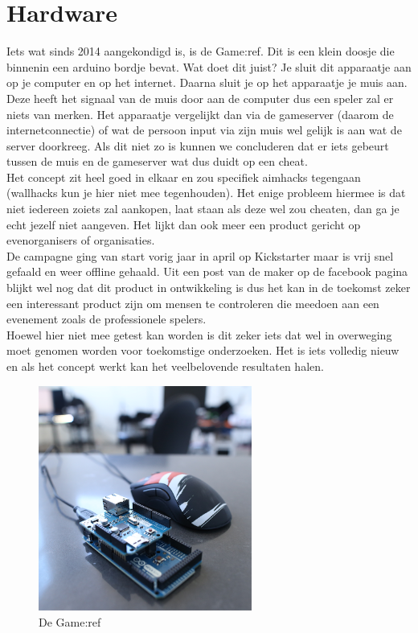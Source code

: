 \documentclass[pdftex,a4paper,12pt,twoside]{report}
\begin{document}
\section{Hardware}
\label{sec:antihardware}
Iets wat sinds 2014 aangekondigd is, is de Game:ref. Dit is een klein doosje die binnenin een arduino bordje bevat. Wat doet dit juist? Je sluit dit apparaatje aan op je computer en op het internet. Daarna sluit je op het apparaatje je muis aan. Deze heeft het signaal van de muis door aan de computer dus een speler zal er niets van merken. 
Het apparaatje vergelijkt dan via de gameserver (daarom de internetconnectie) of wat de persoon input via zijn muis wel gelijk is aan wat de server doorkreeg. Als dit niet zo is kunnen we concluderen dat er iets gebeurt tussen de muis en de gameserver wat dus duidt op een cheat. 
\\

Het concept zit heel goed in elkaar en zou specifiek aimhacks tegengaan (wallhacks kun je hier niet mee tegenhouden). Het enige probleem hiermee is dat niet iedereen zoiets zal aankopen, laat staan als deze wel zou cheaten, dan ga je echt jezelf niet aangeven. Het lijkt dan ook meer een product gericht op evenorganisers of organisaties. 
\\

De campagne ging van start vorig jaar in april op Kickstarter maar is vrij snel gefaald en weer offline gehaald. Uit een post van de maker op de facebook pagina blijkt wel nog dat dit product in ontwikkeling is dus het kan in de toekomst zeker een interessant product zijn om mensen te controleren die meedoen aan een evenement zoals de professionele spelers.
\citep{gameref} 
\\

Hoewel hier niet mee getest kan worden is dit zeker iets dat wel in overweging moet genomen worden voor toekomstige onderzoeken. Het is iets volledig nieuw en als het concept werkt kan het veelbelovende resultaten halen.

\begin{figure}
\centering
\includegraphics[width=7cm]{img/game-ref1}
\caption{De Game:ref}
\end{figure}
\end{document}
